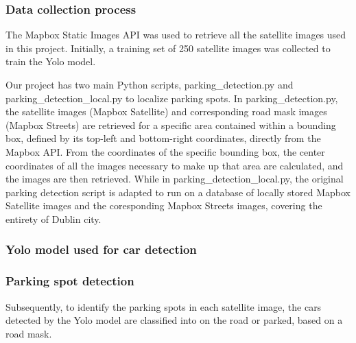 \subsubsection{Data collection process}
The Mapbox Static Images API was used to retrieve all the satellite images used in this project.
Initially, a training set of 250 satellite images was collected to train the Yolo model.

Our project has two main Python scripts, parking_detection.py and parking_detection_local.py to localize parking spots.
In parking_detection.py, the satellite images (Mapbox Satellite) and corresponding road mask images (Mapbox Streets) are retrieved for a specific area contained within a bounding box, defined by its top-left and bottom-right coordinates, directly from the Mapbox API.
From the coordinates of the specific bounding box, the center coordinates of all the images necessary to make up that area are calculated, and the images are then retrieved.
While in parking_detection_local.py, the original parking detection script is adapted to run on a database of locally stored Mapbox Satellite images and the coresponding Mapbox Streets images, covering the entirety of Dublin city.

\subsubsection{Yolo model used for car detection}


\subsubsection{Parking spot detection}
Subsequently, to identify the parking spots in each satellite image, the cars detected by the Yolo model are classified into on the road or parked, based on a road mask.

